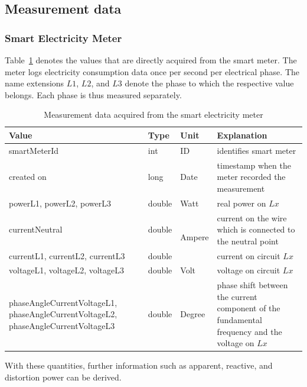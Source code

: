 \subsection{Measurement data}
\subsubsection{Smart Electricity Meter}
Table~\ref{tab:meter_values} denotes the values that are directly acquired from the smart meter. The meter logs electricity consumption data once per second per electrical phase. The name extensions $L1$, $L2$, and $L3$ denote the phase to which the respective value belongs. 
Each phase is thus measured separately. 

\begin{table}[htdp]
\caption{Measurement data acquired from the smart electricity meter\cite{recognize_home_appliances}}
\begin{center}
\begin{tabular}{|p{5cm}|l|l|p{4cm}|}
\hline
Value  & Type & Unit & Explanation \\
\hline
\hline
smartMeterId  & int & ID & identifies smart meter\\
\hline
created on & long & Date & timestamp when the meter recorded the measurement\\
\hline 
powerL1, powerL2, powerL3  & double & Watt & real power on $Lx$\\
\hline
currentNeutral & double & \multirow{2}{*}{Ampere} & current on the wire which is connected to the neutral point \\
\cline{1-2}\cline{4-4}   
currentL1, currentL2, currentL3 & double & & current on circuit $Lx$\\
\hline
voltageL1, voltageL2, voltageL3 & double & Volt & voltage on circuit $Lx$\\ 
\hline
phaseAngleCurrentVoltageL1, phaseAngleCurrentVoltageL2, phaseAngleCurrentVoltageL3  & double & Degree & phase shift between the current component of the fundamental frequency and the voltage on $Lx$\\
\hline      
\end{tabular}
\end{center}
\label{tab:meter_values}
\end{table}%

With these quantities, further information such as apparent, reactive, and distortion power can be derived. 

